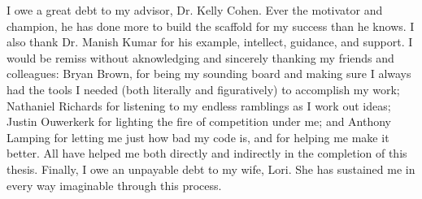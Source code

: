 I owe a great debt to my advisor, Dr. Kelly Cohen. Ever the motivator and champion, he has done more to build
the scaffold for my success than he knows. I also thank Dr. Manish Kumar for his example, intellect, guidance,
and support. I would be remiss without aknowledging and sincerely thanking my friends and colleagues: Bryan
Brown, for being my sounding board and making sure I always had the tools I needed (both literally and
figuratively) to accomplish my work; Nathaniel Richards for listening to my endless ramblings as I work out
ideas; Justin Ouwerkerk for lighting the fire of competition under me; and Anthony Lamping for letting me
just how bad my code is, and for helping me make it better. All have helped me both directly and indirectly in
the completion of this thesis. Finally, I owe an unpayable debt to my wife, Lori. She has sustained me in
every way imaginable through this process. 
